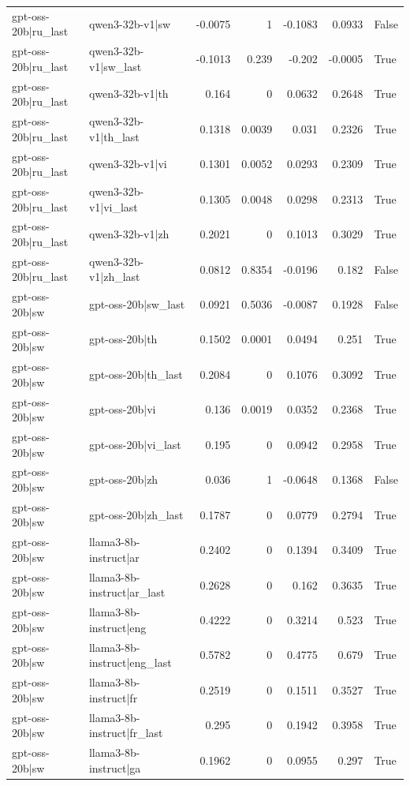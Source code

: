 \begin{table}
\begin{tabular}{l l r r r r l}
gpt-oss-20b|ru_last & qwen3-32b-v1|sw & -0.0075 & 1 & -0.1083 & 0.0933 & False \\
gpt-oss-20b|ru_last & qwen3-32b-v1|sw_last & -0.1013 & 0.239 & -0.202 & -0.0005 & True \\
gpt-oss-20b|ru_last & qwen3-32b-v1|th & 0.164 & 0 & 0.0632 & 0.2648 & True \\
gpt-oss-20b|ru_last & qwen3-32b-v1|th_last & 0.1318 & 0.0039 & 0.031 & 0.2326 & True \\
gpt-oss-20b|ru_last & qwen3-32b-v1|vi & 0.1301 & 0.0052 & 0.0293 & 0.2309 & True \\
gpt-oss-20b|ru_last & qwen3-32b-v1|vi_last & 0.1305 & 0.0048 & 0.0298 & 0.2313 & True \\
gpt-oss-20b|ru_last & qwen3-32b-v1|zh & 0.2021 & 0 & 0.1013 & 0.3029 & True \\
gpt-oss-20b|ru_last & qwen3-32b-v1|zh_last & 0.0812 & 0.8354 & -0.0196 & 0.182 & False \\
gpt-oss-20b|sw & gpt-oss-20b|sw_last & 0.0921 & 0.5036 & -0.0087 & 0.1928 & False \\
gpt-oss-20b|sw & gpt-oss-20b|th & 0.1502 & 0.0001 & 0.0494 & 0.251 & True \\
gpt-oss-20b|sw & gpt-oss-20b|th_last & 0.2084 & 0 & 0.1076 & 0.3092 & True \\
gpt-oss-20b|sw & gpt-oss-20b|vi & 0.136 & 0.0019 & 0.0352 & 0.2368 & True \\
gpt-oss-20b|sw & gpt-oss-20b|vi_last & 0.195 & 0 & 0.0942 & 0.2958 & True \\
gpt-oss-20b|sw & gpt-oss-20b|zh & 0.036 & 1 & -0.0648 & 0.1368 & False \\
gpt-oss-20b|sw & gpt-oss-20b|zh_last & 0.1787 & 0 & 0.0779 & 0.2794 & True \\
gpt-oss-20b|sw & llama3-8b-instruct|ar & 0.2402 & 0 & 0.1394 & 0.3409 & True \\
gpt-oss-20b|sw & llama3-8b-instruct|ar_last & 0.2628 & 0 & 0.162 & 0.3635 & True \\
gpt-oss-20b|sw & llama3-8b-instruct|eng & 0.4222 & 0 & 0.3214 & 0.523 & True \\
gpt-oss-20b|sw & llama3-8b-instruct|eng_last & 0.5782 & 0 & 0.4775 & 0.679 & True \\
gpt-oss-20b|sw & llama3-8b-instruct|fr & 0.2519 & 0 & 0.1511 & 0.3527 & True \\
gpt-oss-20b|sw & llama3-8b-instruct|fr_last & 0.295 & 0 & 0.1942 & 0.3958 & True \\
gpt-oss-20b|sw & llama3-8b-instruct|ga & 0.1962 & 0 & 0.0955 & 0.297 & True \\

\end{tabular}
\end{table}

